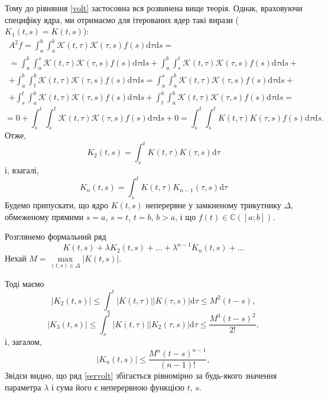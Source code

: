 \documentclass[14pt,twoside]{extreport}
\theoremstyle{mystyle}
\numberwithin{equation}{chapter}
\newcommand{\cab}{\mathbb{C}([a; b])}
\begin{document}
Тому до рівняння \eqref{volt} застосовна вся розвинена вище теорія. Однак, враховуючи специфіку ядра, ми отримаємо для ітерованих ядер такі вирази ($K_1(t, s) = K(t, s)$):
\begin{multline*}
A^2f=\int_{a}^{b}\int_{a}^{b}\mathscr{K}(t, \tau)\mathscr{K}(\tau, s)f(s)\mathrm{d}\tau\mathrm{d}s=\\
=\int_{a}^{b}\int_{a}^{s}\mathscr{K}(t, \tau)\mathscr{K}(\tau, s)f(s)\mathrm{d}\tau\mathrm{d}s + \int_{a}^{b}\int_{s}^{t}\mathscr{K}(t, \tau)\mathscr{K}(\tau, s)f(s)\mathrm{d}\tau\mathrm{d}s +\\
+ \int_{a}^{b}\int_{t}^{b}\mathscr{K}(t, \tau)\mathscr{K}(\tau, s)f(s)\mathrm{d}\tau\mathrm{d}s=\int_{a}^{s}\int_{a}^{b}\mathscr{K}(t, \tau)\mathscr{K}(\tau, s)f(s)\mathrm{d}\tau\mathrm{d}s +\\
+ \int_{s}^{t}\int_{a}^{b}\mathscr{K}(t, \tau)\mathscr{K}(\tau, s)f(s)\mathrm{d}\tau\mathrm{d}s + \int_{t}^{b}\int_{a}^{b}\mathscr{K}(t, \tau)\mathscr{K}(\tau, s)f(s)\mathrm{d}\tau\mathrm{d}s=
\end{multline*}
\begin{equation*}
= 0 + \int_{s}^{t}\int_{s}^{t}\mathscr{K}(t, \tau)\mathscr{K}(\tau, s)f(s)\mathrm{d}\tau\mathrm{d}s + 0= \int_{s}^{t}\int_{s}^{t}K(t, \tau) K(\tau, s)f(s)\mathrm{d}\tau\mathrm{d}s.
\end{equation*}
Отже,
\begin{equation}\label{iterkern}
K_2(t, s) = \int_s^t K(t, \tau) K(\tau, s) \mathrm{d}\tau
\end{equation}
і, взагалі,
\begin{equation}\label{iterkernn}
K_n(t, s) = \int_s^t K(t, \tau) K_{n-1}(\tau, s) \mathrm{d}\tau
\end{equation}
Будемо припускати, що ядро $K(t, s)$ неперервне у замкненому трикутнику $\Delta$, обмеженому прямими $s = a$, $s = t$, $t = b$, $b > a$, і що $f(t) \in \cab$.

Розглянемо формальний ряд
\begin{equation}\label{servolt}
K(t, s) + \lambda K_2(t, s) + \ldots + \lambda^{n-1} K_n(t, s) + \ldots
\end{equation}
Нехай $M = \max\limits_{(t, s) \in\Delta} |K(t, s)|$.

Тоді маємо
\[
|K_2(t, s)| \leqslant \int_{s}^{t} |K(t, \tau)| |K(\tau, s)| \mathrm{d}\tau \leqslant M^2 (t-s),
\]
\[
|K_3(t, s)| \leqslant \int_{s}^{t} |K(t, \tau)| |K_2(\tau, s)| \mathrm{d}\tau \leqslant \dfrac{M^3 (t-s)^2}{2!},
\]
і, загалом,
\begin{equation}\label{estvoktkern}
|K_n(t, s)| \leqslant \dfrac{M^n (t-s)^{n-1}}{(n-1)!},
\end{equation}
Звідси видно, що ряд \eqref{servolt} збігається рівномірно за будь-якого значення параметра $\lambda$ і сума його є неперервною функцією $t$, $s$.
\end{document}
